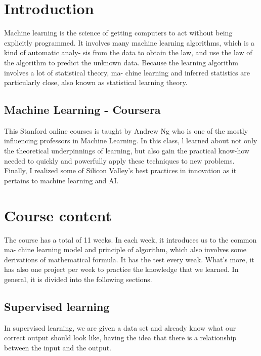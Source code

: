 \documentclass[a4paper]{article}
\begin{document}
\section{Introduction}
\Large{
	Machine learning is the science of getting computers to act without being explicitly programmed. It involves many machine learning algorithms, which is a kind of automatic analy- sis from the data to obtain the law, and use the law of the algorithm to predict the unknown data. Because the learning algorithm involves a lot of statistical theory, ma- chine learning and inferred statistics are particularly close, also known as statistical learning theory.
\subsection{Machine Learning - Coursera}
This Stanford online courses is taught by Andrew Ng who is one of the mostly influencing professors in Machine Learning. In this class,  l learned about not only the theoretical underpinnings of learning, but also gain the practical know-how needed to quickly and powerfully apply these techniques to new problems. Finally, I realized some of Silicon Valley's best practices in innovation as it pertains to machine learning and AI.


\section{Course content}
The course has a total of 11 weeks. In each week, it introduces us to the common ma- chine learning model and principle of algorithm, which also involves some derivations of mathematical formula. It has the test every weak. What's more, it has also one project per week to practice the knowledge that we learned. In general, it is divided into the following sections.
\subsection{Supervised learning}
In supervised learning, we are given a data set and already know what our correct output should look like, having the idea that there is a relationship between the input and the output.\\
}
\end{document}
